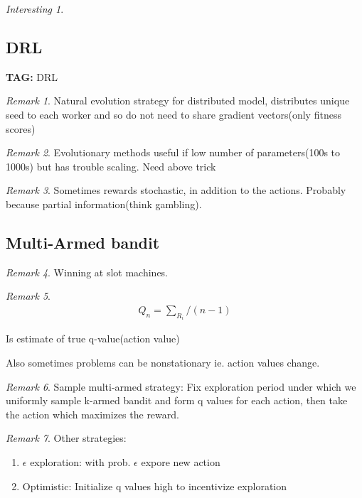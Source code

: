 \documentclass[11pt]{article}
\theoremstyle{remark}
\newtheorem{remark}{Remark}
\newtheorem{interest}{Interesting}
\begin{document}
\begin{interest}
\subsection{DRL}

\textbf{TAG:} DRL

\begin{remark}
	Natural evolution strategy for distributed model, distributes unique seed to each worker and so do not need to share gradient vectors(only fitness scores)
\end{remark}

\begin{remark}
	Evolutionary methods useful if low number of parameters(100s to 1000s) but has trouble scaling. Need above trick
\end{remark}

\begin{remark}
	Sometimes rewards stochastic, in addition to the actions. Probably because partial information(think gambling).
\end{remark}

\subsection{Multi-Armed bandit}

\begin{remark}
	Winning at slot machines. 
\end{remark}

\begin{remark}
	\begin{align*}
		Q_n = \sum_{R_i}/(n-1)
	\end{align*}

	Is estimate of true q-value(action value)

	Also sometimes problems can be nonstationary ie. action values change. 
\end{remark}

\begin{remark}
	Sample multi-armed strategy: Fix exploration period under which we uniformly sample k-armed bandit and form q values for each action, then take the action which maximizes the reward.
\end{remark}

\begin{remark}
	Other strategies:
	\begin{enumerate}
		\item $\epsilon$ exploration: with prob. $\epsilon$ expore new action
		\item Optimistic: Initialize q values high to incentivize exploration
	\end{enumerate}
\end{remark}


\end{interest}
\end{document}
